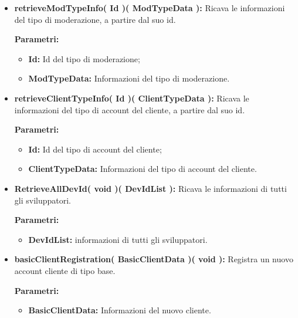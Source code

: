 \begin{itemize}
\begin{itemize}
			\item \textbf{retrieveModTypeInfo( Id )( ModTypeData ):} Ricava le informazioni del tipo di moderazione, a partire dal suo id.
				\begin{description}
    				\item[\textbf{Parametri:}]
				\end{description}
				\begin{itemize}
					\item \textbf{Id:} Id del tipo di moderazione;
					\item \textbf{ModTypeData:} Informazioni del tipo di moderazione.
				\end{itemize}
				
			\item \textbf{retrieveClientTypeInfo( Id )( ClientTypeData ):} Ricava le informazioni del tipo di account del cliente, a partire dal suo id.
				\begin{description}
    				\item[\textbf{Parametri:}]
				\end{description}
				\begin{itemize}
					\item \textbf{Id:} Id del tipo di account del cliente;
					\item \textbf{ClientTypeData:} Informazioni del tipo di account del cliente.
				\end{itemize}
			
			\item \textbf{RetrieveAllDevId( void )( DevIdList ):} Ricava le informazioni di tutti gli sviluppatori.
			\begin{description}
				\item[\textbf{Parametri:}]
			\end{description}
			\begin{itemize}
				\item \textbf{DevIdList:} informazioni di tutti gli sviluppatori.
			\end{itemize}
				
				
				
			\item \textbf{basicClientRegistration( BasicClientData )( void ):} Registra un nuovo account cliente di tipo base.
				\begin{description}
    				\item[\textbf{Parametri:}]
				\end{description}
				\begin{itemize}
					\item \textbf{BasicClientData:} Informazioni del nuovo cliente.
				\end{itemize}
				

\end{itemize}
\end{itemize}
